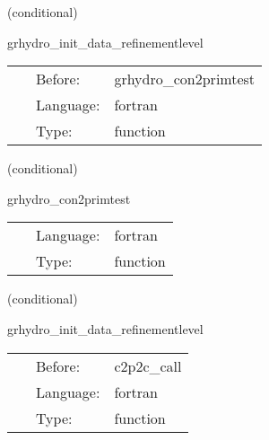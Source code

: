 \vspace{5mm}

   (conditional) 

\hspace{5mm} grhydro\_init\_data\_refinementlevel 

\hspace{5mm}{\it calculate current refinement level } 


\hspace{5mm}

 \begin{tabular*}{160mm}{cll} 
~ & Before:  & grhydro\_con2primtest \\ 
~ & Language:  & fortran \\ 
~ & Type:  & function \\ 
\end{tabular*} 


\vspace{5mm}

   (conditional) 

\hspace{5mm} grhydro\_con2primtest 

\hspace{5mm}{\it testing the conservative to primitive solver } 


\hspace{5mm}

 \begin{tabular*}{160mm}{cll} 
~ & Language:  & fortran \\ 
~ & Type:  & function \\ 
\end{tabular*} 


\vspace{5mm}

   (conditional) 

\hspace{5mm} grhydro\_init\_data\_refinementlevel 

\hspace{5mm}{\it calculate current refinement level } 


\hspace{5mm}

 \begin{tabular*}{160mm}{cll} 
~ & Before:  & c2p2c\_call \\ 
~ & Language:  & fortran \\ 
~ & Type:  & function \\ 
\end{tabular*} 


